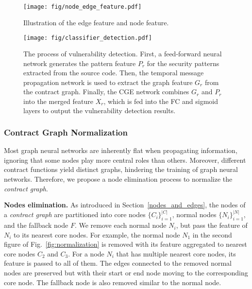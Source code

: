 \begin{figure}
    \begin{center}
     \texttt{[image: fig/node\_edge\_feature.pdf]}
    \end{center}
 \caption{Illustration of the edge feature and node feature.}
  \label{fig:features}
   \vspace{-1.6em}
\end{figure}

\begin{figure*}
    \begin{center}
     \texttt{[image: fig/classifier\_detection.pdf]}
    \end{center}
 \caption{The process of vulnerability detection. First, a feed-forward neural network generates the pattern feature $P_{r}$ for the security patterns extracted from the source code. Then, the temporal message propagation network  is used to extract the graph feature $G_{r}$ from the contract graph. Finally, the CGE network combines $G_{r}$ and $P_{r}$ into the merged feature $X_{r}$, which is fed into the FC and sigmoid layers to output the vulnerability detection results.}
  \label{fig:classifier}
   \vspace{-1.6em}
\end{figure*}

\subsubsection{Contract Graph Normalization}
\label{graph_normalization}
Most graph neural networks are inherently flat when propagating information, ignoring that some nodes play more central roles than others. Moreover, different contract functions yield distinct graphs, hindering the training of graph neural networks. Therefore, we propose a node elimination process to normalize the \emph{contract graph}.

\textbf{Nodes elimination.} As introduced in Section~\ref{nodes_and_edges}, the nodes of a \emph{contract graph} are partitioned into core nodes $\{C_{i}\}_{i=1}^{|C|}$, normal nodes $\{N_{i}\}_{i=1}^{|N|}$, and the fallback node $F$. We remove each normal node $N_i$, but pass the feature of $N_i$ to its nearest core nodes. For example, the normal node $N_1$ in the second figure of Fig.~\ref{fig:normalization} is removed with its feature aggregated to nearest core nodes $C_2$ and $C_3$. For a node $N_i$ that has multiple nearest core nodes, its feature is passed to all of them. The edges connected to the removed normal nodes are preserved but with their start or end node moving to the corresponding core node. The fallback node is also removed similar to the normal node. 

